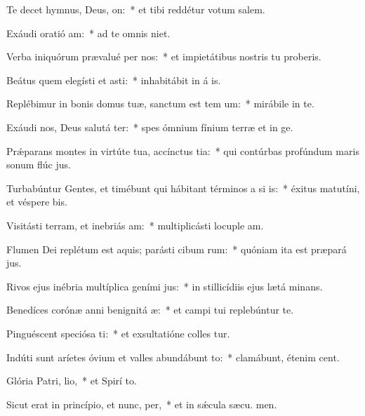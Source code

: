 \item Te decet hymnus, Deus,  on:~* et tibi reddétur votum  salem.
\item Exáudi oratió am:~* ad te omnis  niet.
\item Verba iniquórum prævalué per nos:~* et impietátibus nostris tu proberis.
\item Beátus quem elegísti et asti:~* inhabitábit in á is.
\item Replébimur in bonis domus tuæ, sanctum est tem um:~* mirábile in te.
\item Exáudi nos, Deus salutá ter:~* spes ómnium fínium terræ et in  ge.
\item Prǽparans montes in virtúte tua, accínctus tia:~* qui contúrbas profúndum maris sonum flúc jus.
\item Turbabúntur Gentes, et timébunt qui hábitant términos a si is:~* éxitus matutíni, et véspere bis.
\item Visitásti terram, et inebriás am:~* multiplicásti locuple am.
\item Flumen Dei replétum est aquis; parásti cibum rum:~* quóniam ita est præpará jus.
\item Rivos ejus inébria multíplica geními jus:~* in stillicídiis ejus lætá minans.
\item Benedíces corónæ anni benignitá æ:~* et campi tui replebúntur te.
\item Pinguéscent speciósa ti:~* et exsultatióne colles tur.
\item Indúti sunt aríetes óvium et valles abundábunt to:~* clamábunt, étenim  cent.
\item Glória Patri,  lio,~* et Spirí to.
\item Sicut erat in princípio, et nunc,  per,~* et in sǽcula sæcu. men.
